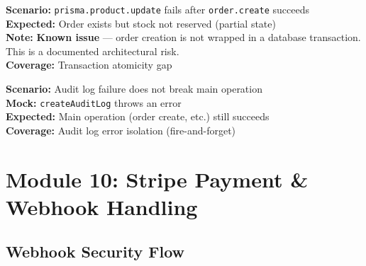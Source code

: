 \documentclass[12pt,a4paper]{report}
\newcommand{\pone}{\textbf{\color{p1red}P1}}
\newcommand{\ptwo}{\textbf{\color{p2orange}P2}}
\begin{document}
\begin{tcolorbox}[criticalbox, title={DB-007 \hfill \pone\ --- Atomicity Gap}]
\textbf{Scenario:} \texttt{prisma.product.update} fails after \texttt{order.create} succeeds \\
\textbf{Expected:} Order exists but stock not reserved (partial state) \\
\textbf{Note:} \textbf{Known issue} --- order creation is not wrapped in a database transaction. \\
This is a documented architectural risk. \\
\textbf{Coverage:} Transaction atomicity gap
\end{tcolorbox}

\begin{tcolorbox}[testbox, title={DB-008 \hfill \ptwo}]
\textbf{Scenario:} Audit log failure does not break main operation \\
\textbf{Mock:} \texttt{createAuditLog} throws an error \\
\textbf{Expected:} Main operation (order create, etc.) still succeeds \\
\textbf{Coverage:} Audit log error isolation (fire-and-forget)
\end{tcolorbox}


\chapter{Module 10: Stripe Payment \& Webhook Handling}

\section{Webhook Security Flow}
\end{document}
